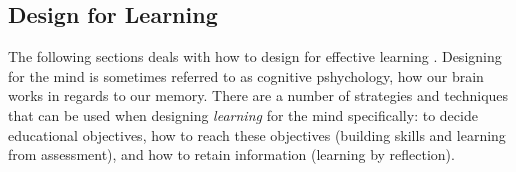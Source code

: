 \subsection{Design for Learning}


The following sections deals with how to design for effective learning \citep{dirksen}. Designing for the mind is sometimes referred to as cognitive pshychology, how our brain works in regards to our memory. There are a number of strategies and techniques that can be used when designing \textit{learning} for the mind specifically: to decide educational objectives, how to reach these objectives (building skills and learning from assessment), and how to retain information (learning by reflection).






%

